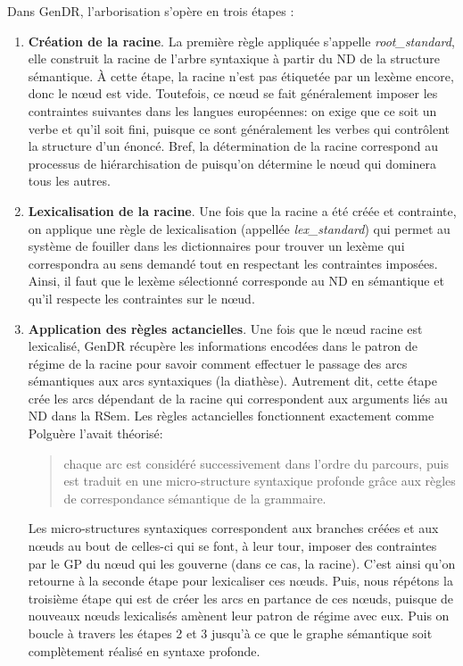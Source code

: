 Dans GenDR, l'arborisation s'opère en trois étapes \citep{lareau18}:

\begin{enumerate}
  \item \textbf{Création de la racine}.
  La première règle appliquée s'appelle \emph{root\_standard}, elle construit la racine de l'arbre syntaxique à partir du \ac{ND} de la structure sémantique. À cette étape, la racine n'est pas étiquetée par un lexème encore, donc le n\oe{}ud est vide. Toutefois, ce n\oe{}ud se fait généralement imposer les contraintes suivantes dans les langues européennes: on exige que ce soit un verbe et qu'il soit fini, puisque ce sont généralement les verbes qui contrôlent la structure d'un énoncé. Bref, la détermination de la racine correspond au processus de hiérarchisation de \cite{PolguereStructurationmisejeu1990} puisqu'on détermine le n\oe{}ud qui dominera tous les autres.

  \item \textbf{Lexicalisation de la racine}.
  Une fois que la racine a été créée et contrainte, on applique une règle de lexicalisation (appellée \emph{lex\_standard}) qui permet au système de fouiller dans les dictionnaires pour trouver un lexème qui correspondra au sens demandé tout en respectant les contraintes imposées. Ainsi, il faut que le lexème sélectionné corresponde au \ac{ND} en sémantique et qu'il respecte les contraintes sur le n\oe{}ud.

  \item \textbf{Application des règles actancielles}.
  Une fois que le n\oe{}ud racine est lexicalisé, GenDR récupère les informations encodées dans le patron de régime de la racine pour savoir comment effectuer le passage des arcs sémantiques aux arcs syntaxiques (la diathèse). Autrement dit, cette étape crée les arcs dépendant de la racine qui correspondent aux arguments liés au \ac{ND} dans la \ac{RSem}. Les règles actancielles fonctionnent exactement comme Polguère l'avait théorisé:
\begin{quote}
chaque arc est considéré successivement dans l'ordre du parcours, puis est traduit en une micro-structure syntaxique profonde grâce aux règles de correspondance sémantique de la grammaire.
\end{quote}
\vspace{-\baselineskip}
\hfill
\cite[p.~273]{PolguereStructurationmisejeu1990}

Les micro-structures syntaxiques correspondent aux branches créées et aux n\oe{}uds  au bout de celles-ci qui se font, à leur tour, imposer des contraintes par le \ac{GP} du n\oe{}ud qui les gouverne (dans ce cas, la racine). C'est ainsi qu'on retourne à la seconde étape pour lexicaliser ces n\oe{}uds. Puis, nous répétons la troisième étape qui est de créer les arcs en partance de ces n\oe{}uds, puisque de nouveaux n\oe{}uds lexicalisés amènent leur patron de régime avec eux. Puis on boucle à travers les étapes 2 et 3 jusqu'à ce que le graphe sémantique soit complètement réalisé en syntaxe profonde.
\end{enumerate} 

